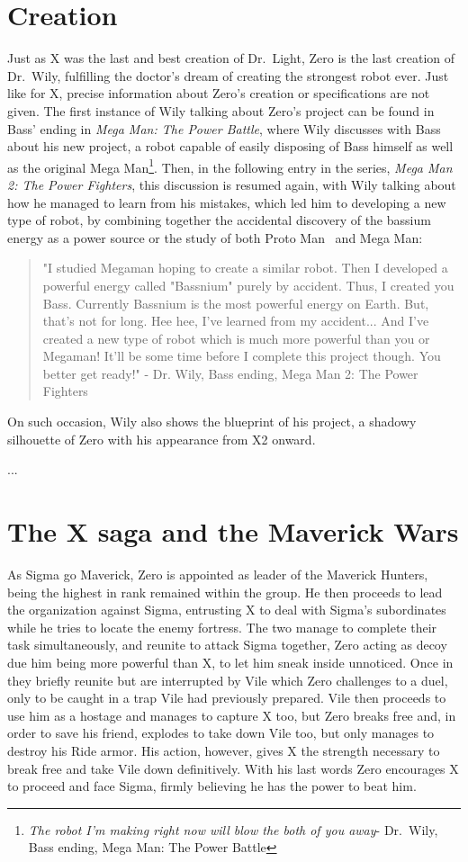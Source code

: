 \section{Creation}
Just as X was the last and best creation of Dr.~Light, Zero is the last creation of Dr.~Wily, fulfilling the doctor's dream of creating the strongest robot ever. 
Just like for X, precise information about Zero's creation or specifications are not given. The first instance of Wily talking about Zero's project can be found in Bass' ending in \textit{Mega Man: The Power Battle}, where Wily discusses with Bass about his new project, a robot capable of easily disposing of Bass himself as well as the original Mega Man\footnote{\textit{The robot I'm making right now will blow the both of you away}- Dr.~Wily, Bass ending, Mega Man: The Power Battle}. Then, in the following entry in the series, \textit{ Mega Man 2: The Power Fighters}, this discussion is resumed again, with Wily talking about how he managed to learn from his mistakes, which led him to developing a new type of robot, by combining together the accidental discovery of the bassium energy as a power source or the study of both Proto Man~\cite{art:mmnetwork:24_mavs} and Mega Man:
\begin{quote}
	"I studied Megaman hoping to create a similar robot. Then I developed a powerful energy called "Bassnium" purely by accident. Thus, I created you Bass. Currently Bassnium is the most powerful energy on Earth. But, that's not for long. Hee hee, I've learned from my accident... And I've created a new type of robot which is much more powerful than you or Megaman! It'll be some time before I complete this project though. You better get ready!" - Dr. Wily, Bass ending, Mega Man 2: The Power Fighters
\end{quote}
On such occasion, Wily also shows the blueprint of his project, a shadowy silhouette of Zero with his appearance from X2 onward.

...

\section{The X saga and the Maverick Wars}
As Sigma go Maverick, Zero is appointed as leader of the Maverick Hunters, being the highest in rank remained within the group. He then proceeds to lead the organization against Sigma, entrusting X to deal with Sigma's subordinates while he tries to locate the enemy fortress. The two manage to complete their task simultaneously, and reunite to attack Sigma together, Zero acting as decoy due him being more powerful than X, to let him sneak inside unnoticed. Once in they briefly reunite but are interrupted by Vile which Zero  challenges to a duel, only to be caught in a trap Vile had previously prepared. Vile then proceeds to use him as a hostage and manages to capture X too, but Zero breaks free and, in order to save his friend, explodes to take down Vile too, but only manages to destroy his Ride armor. His action, however, gives X the strength necessary to break free and take Vile down definitively. With his last words Zero encourages X to proceed and face Sigma, firmly believing he has the power to beat him.

